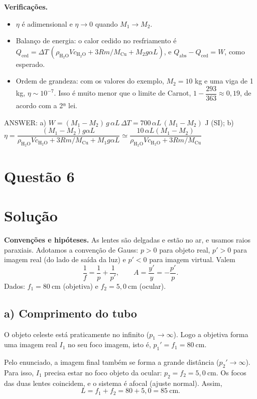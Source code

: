 \documentclass{article}%
\begin{document}
\textbf{Verificações.}
\begin{itemize}
\item $\eta$ é adimensional e $\eta\to 0$ quando $M_1\to M_2$.
\item Balanço de energia: o calor cedido no resfriamento é $Q_{\text{ced}}=\Delta T\,(\rho_{\text{H}_2\text{O}}Vc_{\text{H}_2\text{O}}+3Rm/M_{\text{Cu}}+M_2g\alpha L)$, e $Q_{\text{abs}}-Q_{\text{ced}}=W$, como esperado.
\item Ordem de grandeza: com os valores do exemplo, $M_2=10$ kg e uma viga de 1 kg, $\eta\sim 10^{-7}$. Isso é muito menor que o limite de Carnot, $1-\dfrac{293}{363}\approx 0{,}19$, de acordo com a 2ª lei.
\end{itemize}

ANSWER: a) $W=(M_1-M_2)\,g\,\alpha L\,\Delta T = 700\,\alpha L\,(M_1-M_2)$ J (SI); b) $\eta=\dfrac{(M_1-M_2)g\alpha L}{\rho_{\text{H}_2\text{O}}Vc_{\text{H}_2\text{O}}+3Rm/M_{\text{Cu}}+M_1g\alpha L}\simeq\dfrac{10\,\alpha L(M_1-M_2)}{\rho_{\text{H}_2\text{O}}Vc_{\text{H}_2\text{O}}+3Rm/M_{\text{Cu}}}$%
\newpage%
\section*{Questão 6}

\section*{Solução}

\textbf{Convenções e hipóteses.} As lentes são delgadas e estão no ar, e usamos raios paraxiais. Adotamos a convenção de Gauss: $p>0$ para objeto real, $p'>0$ para imagem real (do lado de saída da luz) e $p'<0$ para imagem virtual. Valem
\[
\frac{1}{f}=\frac{1}{p}+\frac{1}{p'},\qquad A=\frac{y'}{y}=-\frac{p'}{p}.
\]
Dados: $f_1=80\ \text{cm}$ (objetiva) e $f_2=5{,}0\ \text{cm}$ (ocular).

\subsection*{a) Comprimento do tubo}
O objeto celeste está praticamente no infinito ($p_1\to\infty$). Logo a objetiva forma uma imagem real $I_1$ no seu foco imagem, isto é, $p_1'=f_1=80\ \text{cm}$.

Pelo enunciado, a imagem final também se forma a grande distância ($p_2'\to\infty$). Para isso, $I_1$ precisa estar no foco objeto da ocular: $p_2=f_2=5{,}0\ \text{cm}$. Os focos das duas lentes coincidem, e o sistema é afocal (ajuste normal). Assim,
\[
L=f_1+f_2=80+5{,}0=85\ \text{cm}.
\]
\end{document}
